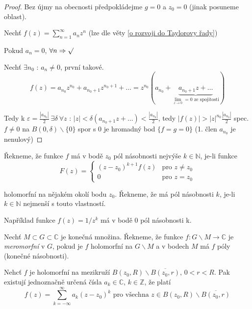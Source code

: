 \begin{proof}
Bez újmy na obecnosti předpokládejme $g=0$ a $z_0=0$ (jinak posuneme oblast).

Nechť $f(z) = \sum_{n=1}^\infty a_n z^n$ (lze dle věty \ref{o rozvoji do Taylorovy řady})

Pokud $a_n = 0$, $\forall n \Rightarrow \surd$

Nechť $\exists n_0 \textrm{ : } a_n \neq 0$, první takové. 
$$f(z) = a_{n_0} z^{n_0} + a_{n_0 + 1} z^{n_0 + 1} + \ldots = z^{n_0} \left( a_{n_0} + \underbrace{a_{n_0 + 1} z + \ldots}_{\lim_{z \to 0} = 0 \textrm{ ze spojitosti}} \right)$$

Tedy k $\varepsilon = \frac{|a_{n_0}|}{2} \ \exists \delta \ \forall z \textrm{ : } |z| < \delta (a_{n_0 + 1} z + \ldots) < \frac{|a_{n_0}|}{2}$, tedy $|f(z)| > |z|^{n_0} \frac{|a_{n_0}|}{2}$ spec. $f \neq 0$ na $B(0, \delta) \backslash \{ 0 \}$ spor s $0$ je hromadný bod $\{ f = g = 0 \}$ (1. člen $a_{n_0}$ je nenulový)
\end{proof}


\begin{definice}
Řekneme, že funkce $f$ má v bodě $z_0$ pól násobnosti nejvýše $k \in \mathbb{N}$, je-li funkce 
\begin{equation}
F(z) = \left\{ \begin{array}{ll}
 (z-z_0)^{k+1}f(z) & \textrm{pro $z \neq z_0$} \nonumber\\
 0 & \textrm{pro $z=z_0$}
  \end{array} \right.
\end{equation}

holomorfní na nějakém okolí bodu $z_0$. Řekneme, že má pól násobnosti $k$, je-li $k \in \mathbb{N}$ nejmenší s touto vlastností.
\end{definice}

Například funkce $f(z) = 1 / z^k$ má v bodě 0 pól násobnosti k.

\begin{definice}
Nechť $M \subset G \subset \mathbb{C}$ je konečná množina. Řekneme, že funkce $f : G \backslash M \rightarrow \mathbb{C}$ je \emph{meromorfní} v $G$, pokud je $f$ holomorfní na $G \backslash M$ a v bodech $M$ má $f$ póly (konečné násobnosti).
\end{definice}

\begin{vetat}
Nehcť $f$ je holomorfní na mezikruží $B(z_0, R) \backslash \overline{B(z_0, r)}$, $0 < r < R$. Pak existují jednoznačně určená čísla $a_k \in \mathbb{C}$, $k \in \mathbb{Z}$, že platí 
$$f(z) = \sum_{k= - \infty}^\infty a_k (z-z_0)^k \textrm{ pro všechna } z \in B(z_0, R) \backslash \overline{B(z_0, r)}$$
\end{vetat}